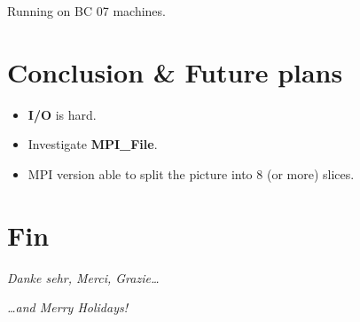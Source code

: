 \documentclass[12pt]{article}
\begin{document}
\small Running on BC 07 machines.

\section{Conclusion \& Future plans}

\begin{itemize}
    \item \textbf{I/O} is hard.
    \item Investigate \textbf{MPI\_File}.
    \item MPI version able to split the picture into 8 (or more) slices.
\end{itemize}

\section{Fin}
\vspace{4cm}
\begin{center}
\emph{Danke sehr, Merci, Grazie…}

\textasteriskcentered \textasteriskcentered \textasteriskcentered

\emph{…and Merry Holidays!}
\end{center}
\end{document}
